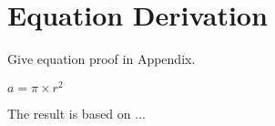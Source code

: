 %

\chapter{Equation Derivation}

{
Give equation proof in Appendix.
}

$a = \pi \times r^2$

The result is based on \cite{lyle88}...

\chapterend

